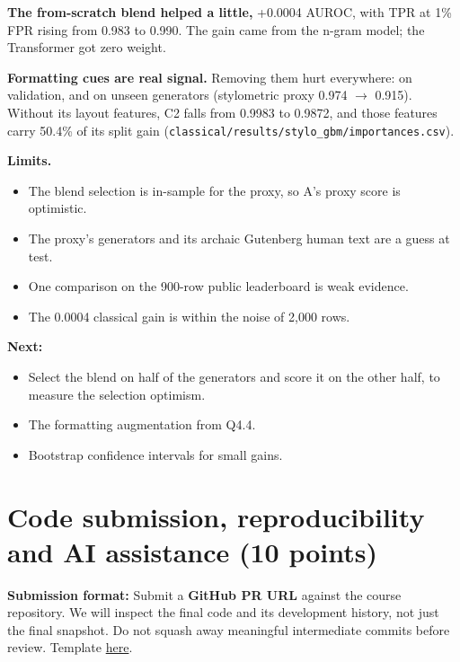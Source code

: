 \documentclass[11pt,letterpaper]{article}
\begin{document}
\textbf{The from-scratch blend helped a little,} +0.0004 AUROC, with TPR at 1\% FPR rising from 0.983 to 0.990. The gain came from the n-gram model; the Transformer got zero weight.

\textbf{Formatting cues are real signal.} Removing them hurt everywhere: on validation, and on unseen generators (stylometric proxy 0.974 $\to$ 0.915). Without its layout features, C2 falls from 0.9983 to 0.9872, and those features carry 50.4\% of its split gain (\texttt{classical/results/stylo\_gbm/importances.csv}).

\textbf{Limits.}
\begin{itemize}
\item The blend selection is in-sample for the proxy, so A's proxy score is optimistic.
\item The proxy's generators and its archaic Gutenberg human text are a guess at test.
\item One comparison on the 900-row public leaderboard is weak evidence.
\item The 0.0004 classical gain is within the noise of 2,000 rows.
\end{itemize}

\textbf{Next:}
\begin{itemize}
\item Select the blend on half of the generators and score it on the other half, to measure the selection optimism.
\item The formatting augmentation from Q4.4.
\item Bootstrap confidence intervals for small gains.
\end{itemize}

\section{Code submission, reproducibility and AI assistance (10 points)}
\textbf{Submission format:} Submit a \textbf{GitHub PR URL} against the course repository. We will inspect the final code and its development history, not just the final snapshot. Do not squash away meaningful intermediate commits before review. Template \href{https://github.com/sekhari/human-or-ai-submissions}{here}.
\end{document}
